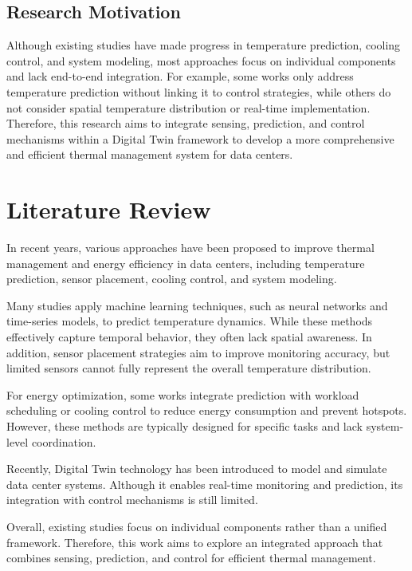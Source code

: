 \documentclass[12pt,a4paper]{article}
\begin{document}
\subsection{Research Motivation}%
Although existing studies have made progress in temperature prediction, cooling control, and system modeling, most approaches focus on individual components and lack end-to-end integration. For example, some works only address temperature prediction without linking it to control strategies, while others do not consider spatial temperature distribution or real-time implementation. Therefore, this research aims to integrate sensing, prediction, and control mechanisms within a Digital Twin framework to develop a more comprehensive and efficient thermal management system for data centers.

\section{Literature Review}

In recent years, various approaches have been proposed to improve thermal management and energy efficiency in data centers, including temperature prediction, sensor placement, cooling control, and system modeling.

Many studies apply machine learning techniques, such as neural networks and time-series models, to predict temperature dynamics. While these methods effectively capture temporal behavior, they often lack spatial awareness. In addition, sensor placement strategies aim to improve monitoring accuracy, but limited sensors cannot fully represent the overall temperature distribution.

For energy optimization, some works integrate prediction with workload scheduling or cooling control to reduce energy consumption and prevent hotspots. However, these methods are typically designed for specific tasks and lack system-level coordination. 

Recently, Digital Twin technology has been introduced to model and simulate data center systems. Although it enables real-time monitoring and prediction, its integration with control mechanisms is still limited.

Overall, existing studies focus on individual components rather than a unified framework. Therefore, this work aims to explore an integrated approach that combines sensing, prediction, and control for efficient thermal management.
\end{document}
